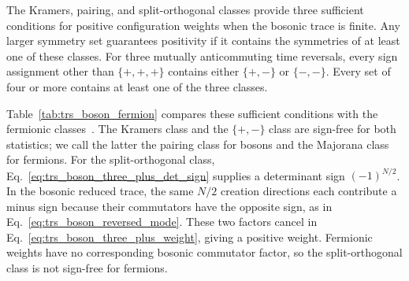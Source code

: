 The Kramers, pairing, and split-orthogonal classes provide three sufficient conditions for positive configuration weights when the bosonic trace is finite. Any larger symmetry set guarantees positivity if it contains the symmetries of at least one of these classes. For three mutually anticommuting time reversals, every sign assignment other than $\{+,+,+\}$ contains either $\{+,-\}$ or $\{-,-\}$. Every set of four or more contains at least one of the three classes.

Table~\ref{tab:trs_boson_fermion} compares these sufficient conditions with the fermionic classes~\cite{li2016prl}. The Kramers class and the $\{+,-\}$ class are sign-free for both statistics; we call the latter the pairing class for bosons and the Majorana class for fermions. For the split-orthogonal class, Eq.~\eqref{eq:trs_boson_three_plus_det_sign} supplies a determinant sign $(-1)^{N/2}$. In the bosonic reduced trace, the same $N/2$ creation directions each contribute a minus sign because their commutators have the opposite sign, as in Eq.~\eqref{eq:trs_boson_reversed_mode}. These two factors cancel in Eq.~\eqref{eq:trs_boson_three_plus_weight}, giving a positive weight. Fermionic weights have no corresponding bosonic commutator factor, so the split-orthogonal class is not sign-free for fermions.

